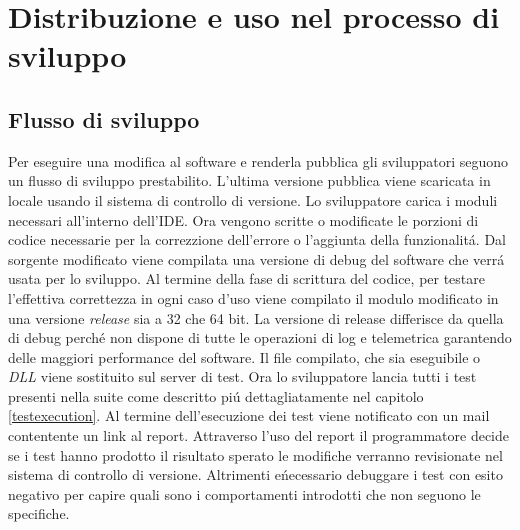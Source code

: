 \chapter{Distribuzione e uso nel processo di sviluppo}
    \section{Flusso di sviluppo}
        Per eseguire una modifica al software e renderla pubblica gli sviluppatori seguono un flusso di sviluppo prestabilito.
        L'ultima versione pubblica viene scaricata in locale usando il sistema di controllo di versione.
        Lo sviluppatore carica i moduli necessari all'interno dell'IDE.
        Ora vengono scritte o modificate le porzioni di codice necessarie per la correzzione dell'errore o l'aggiunta della funzionalit\'a.
        Dal sorgente modificato viene compilata una versione di debug del software che verr\'a usata per lo sviluppo.
        Al termine della fase di scrittura del codice, per testare l'effettiva correttezza in ogni caso d'uso viene compilato il modulo modificato in una versione \textit{release} sia a 32 che 64 bit.
        La versione di release differisce da quella di debug perch\'e non dispone di tutte le operazioni di log e telemetrica garantendo delle maggiori performance del software.
        Il file compilato, che sia eseguibile o \textit{DLL} viene sostituito sul server di test.
        Ora lo sviluppatore lancia tutti i test presenti nella suite come descritto pi\'u dettagliatamente nel capitolo \ref{testexecution}.
        Al termine dell'esecuzione dei test viene notificato con un mail contentente un link al report.
        Attraverso l'uso del report il programmatore decide se i test hanno prodotto il risultato sperato le modifiche verranno revisionate nel sistema di controllo di versione.
        Altrimenti e\' necessario debuggare i test con esito negativo per capire quali sono i comportamenti introdotti che non seguono le specifiche. 

